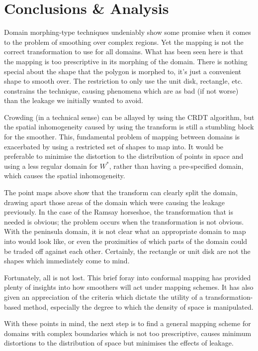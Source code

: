 \section{Conclusions \& Analysis}

Domain morphing-type techniques undeniably show some promise when it comes to the problem of smoothing over complex regions. Yet the \sch mapping is not the correct transformation to use for  all domains. What has been seen here is that the mapping is too prescriptive in its morphing of the domain. There is nothing special about the shape that the polygon is morphed to, it's just a convenient shape to smooth over. The restriction to only use the unit disk, rectangle, etc. constrains the technique, causing phenomena which are as bad (if not worse) than the leakage we initially wanted to avoid.

Crowding (in a technical sense) can be allayed by using the CRDT algorithm, but the spatial inhomogeneity caused by using the \sch transform is still a stumbling block for the smoother. This, fundamental problem of mapping between domains is exacerbated by using a restricted set of shapes to map into. It would be preferable to minimise the distortion to the distribution of points in space and using a less regular domain for $W^*$, rather than having a pre-specified domain, which causes the spatial inhomogeneity.

The point maps above show that the \sch transform can clearly split the domain, drawing apart those areas of the domain which were causing the leakage previously. In the case of the Ramsay horseshoe, the transformation that is needed is obvious; the problem occurs when the transformation is not obvious. With the peninsula domain, it is not clear what an appropriate domain to map into would look like, or even the proximities of which parts of the domain could be traded off against each other. Certainly, the rectangle or unit disk are not the shapes which immediately come to mind.

Fortunately, all is not lost. This brief foray into conformal mapping has provided plenty of insights into how smoothers will act under mapping schemes. It has also given an appreciation of the criteria which dictate the utility of a transformation-based method, especially the degree to which the density of space is manipulated.

With these points in mind, the next step is to find a general mapping scheme for domains with complex boundaries which is not too prescriptive, causes minimum distortions to the distribution of space but minimises the effects of leakage.



